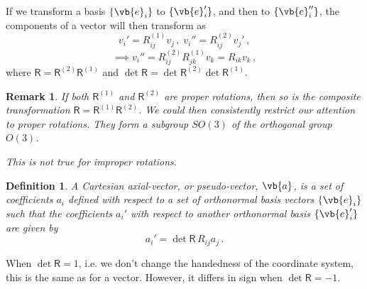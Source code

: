 \documentclass{article}
\theoremstyle{plain}\theoremheaderfont{\normalfont\itshape}\theorembodyfont{\rmfamily}\theoremseparator{.}\newtheorem*{rem}{Remark}\newtheorem*{ex}{Example}\newtheorem*{proof}{Proof}\newtheorem*{altp}{Alternative proof}
\theoremstyle{plain}\theoremheaderfont{\normalfont\bfseries}\theorembodyfont{\rmfamily}\theoremseparator{.}\newtheorem{thm}{Theorem}[section]\newtheorem{lem}[thm]{Lemma}\newtheorem{prop}[thm]{Proposition}\newtheorem*{cor}{Corollary}\newtheorem{defn}[thm]{Definition}\newtheorem{clm}[thm]{Claim}\newtheorem{clminproof}{Claim}
\theoremstyle{break}\theoremheaderfont{\normalfont\itshape}\theorembodyfont{\rmfamily}\theoremseparator{.\medskip}\newtheorem*{proofskip}{Proof}\newtheorem*{exs}{Examples}\newtheorem*{rems}{Remarks}
\theoremstyle{break}\theoremheaderfont{\normalfont\bfseries}\theorembodyfont{\rmfamily}\theoremseparator{.\medskip}\newtheorem{lemskip}[thm]{Lemma}\newtheorem{defnskip}[thm]{Definition}\newtheorem{propskip}[thm]{Proposition}\newtheorem{thmskip}[thm]{Theorem}
\numberwithin{equation}{section}
\begin{document}
	If we transform a basis \(\{\vb{e}_i\}\) to \(\{\vb{e}_i'\}\), and then to \(\{\vb{e}_i''\}\), the components of a vector will then transform as
	\[v_i'=R^{(1)}_{ij}v_j\,,\; v_i''=R^{(2)}_{ij}v_j'\,,\]
	\[\implies v_i''=R^{(2)}_{ij}R^{(1)}_{jk}v_k=R_{ik}v_k\,,\]
	where \(\mathsf{R}=\mathsf{R}^{(2)}\mathsf{R}^{(1)}\) and \(\det\mathsf{R}=\det\mathsf{R}^{(2)}\det\mathsf{R}^{(1)}\).
	\begin{rem}
		If both \(\mathsf{R}^{(1)}\) and \(\mathsf{R}^{(2)}\) are proper rotations, then so is the composite transformation \(\mathsf{R}=\mathsf{R}^{(1)}\mathsf{R}^{(2)}\). We could then consistently restrict our attention to proper rotations. They form a \textit{subgroup} \(SO(3)\) of the orthogonal group \(O(3)\).
		
		This is not true for improper rotations.
	\end{rem}

	\begin{defn}
		A Cartesian \textit{axial-vector}, or \textit{pseudo-vector}, \(\vb{a}\), is a set of coefficients \(a_i\) defined with respect to a set of orthonormal basis vectors \(\{\vb{e}_i\}\) such that the coefficients \(a_i'\) with respect to another orthonormal basis \(\{\vb{e}_i'\}\) are given by
		\[a_i'=\det\mathsf{R}\,R_{ij}a_j\,.\]
	\end{defn}
	When \(\det\mathsf{R}=1\), i.e. we don't change the handedness of the coordinate system, this is the same as for a vector. However, it differs in sign when \(\det\mathsf{R}=-1\).
\end{document}
